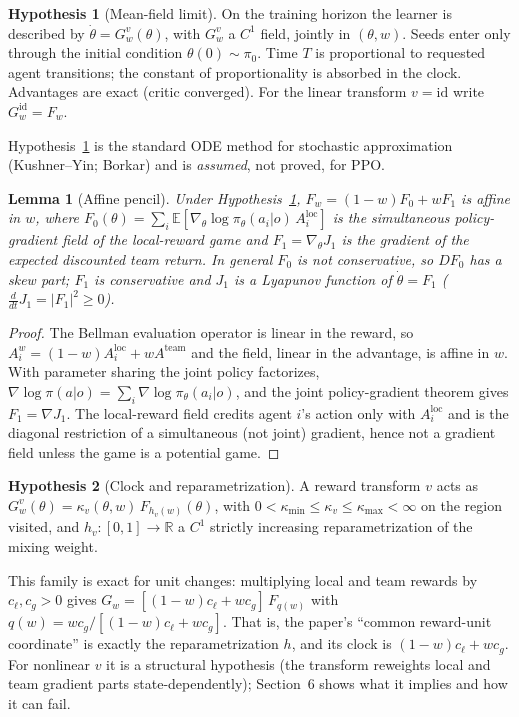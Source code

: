 \documentclass[11pt]{article}
\newtheorem{lemma}{Lemma}
\theoremstyle{definition}
\newtheorem{hyp}{Hypothesis}
\theoremstyle{remark}
\newcommand{\R}{\mathbb{R}}
\newcommand{\E}{\mathbb{E}}
\begin{document}
\begin{hyp}[Mean-field limit]\label{h0}
On the training horizon the learner is described by $\dot\theta=G^v_w(\theta)$, with $G^v_w$ a $C^1$ field, jointly in $(\theta,w)$. Seeds enter only through the initial condition $\theta(0)\sim\pi_0$. Time $T$ is proportional to requested agent transitions; the constant of proportionality is absorbed in the clock. Advantages are exact (critic converged). For the linear transform $v=\mathrm{id}$ write $G^{\mathrm{id}}_w=F_w$.
\end{hyp}

Hypothesis~\ref{h0} is the standard ODE method for stochastic approximation (Kushner--Yin; Borkar) and is \emph{assumed}, not proved, for PPO.

\begin{lemma}[Affine pencil]\label{l1}
Under Hypothesis~\ref{h0}, $F_w=(1-w)F_0+wF_1$ is affine in $w$, where $F_0(\theta)=\sum_i\E[\nabla_\theta\log\pi_\theta(a_i|o)\,A_i^{\mathrm{loc}}]$ is the simultaneous policy-gradient field of the local-reward game and $F_1=\nabla_\theta J_1$ is the gradient of the expected discounted team return. In general $F_0$ is not conservative, so $DF_0$ has a skew part; $F_1$ is conservative and $J_1$ is a Lyapunov function of $\dot\theta=F_1$ ($\tfrac{d}{dt}J_1=|F_1|^2\ge0$).
\end{lemma}
\begin{proof}
The Bellman evaluation operator is linear in the reward, so $A_i^{w}=(1-w)A_i^{\mathrm{loc}}+wA^{\mathrm{team}}$ and the field, linear in the advantage, is affine in $w$. With parameter sharing the joint policy factorizes, $\nabla\log\pi(a|o)=\sum_i\nabla\log\pi_\theta(a_i|o)$, and the joint policy-gradient theorem gives $F_1=\nabla J_1$. The local-reward field credits agent $i$'s action only with $A_i^{\mathrm{loc}}$ and is the diagonal restriction of a simultaneous (not joint) gradient, hence not a gradient field unless the game is a potential game.
\end{proof}

\begin{hyp}[Clock and reparametrization]\label{h2}
A reward transform $v$ acts as $G^v_w(\theta)=\kappa_v(\theta,w)\,F_{h_v(w)}(\theta)$, with $0<\kappa_{\min}\le\kappa_v\le\kappa_{\max}<\infty$ on the region visited, and $h_v:[0,1]\to\R$ a $C^1$ strictly increasing reparametrization of the mixing weight.
\end{hyp}

This family is exact for unit changes: multiplying local and team rewards by $c_\ell,c_g>0$ gives $G_w=[(1-w)c_\ell+wc_g]\,F_{q(w)}$ with $q(w)=wc_g/[(1-w)c_\ell+wc_g]$. That is, the paper's ``common reward-unit coordinate'' is exactly the reparametrization $h$, and its clock is $(1-w)c_\ell+wc_g$. For nonlinear $v$ it is a structural hypothesis (the transform reweights local and team gradient parts state-dependently); Section~6 shows what it implies and how it can fail.
\end{document}
